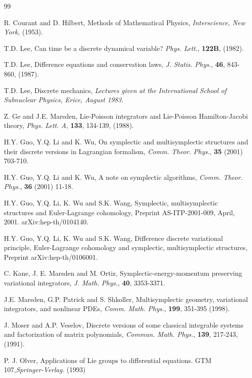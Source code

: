 \documentclass[a4paper,a4paper]{article}
\begin{document}
\begin{thebibliography} {99}

 \label{c1}
R. Courant and D. Hilbert, Methods of Mathematical Physics, {\em Interscience, New
York, } (1953).

\label{td1}
T.D. Lee, Can time be a discrete dynamical variable? {\em Phys.
Lett.}, {\bf 122B}, (1982).

\label{td2}
T.D. Lee, Difference equations and conservation laws, {\em J.
Statis. Phys.}, {\bf 46}, 843-860, (1987).

\label{td3}
T.D. Lee, Discrete mechanics, {\em Lectures given at the
International School of Subnuclear Physics, Erice, August 1983}.

\label{g1}
Z. Ge and J.E. Marsden, Lie-Poisson integrators and Lie-Poisson Hamilton-Jacobi
theory, {\em Phys. Lett. A}, {\bf 133}, 134-139, (1988).


\label{glw1} H.Y. Guo, Y.Q. Li and K. Wu, On symplectic and multisymplectic
structures and their discrete versions in Lagrangian formalism,
{\em Comm. Theor. Phys.}, {\bf 35} (2001) 703-710.

\label{glw2} H.Y. Guo,
Y.Q. Li and K. Wu, A note on symplectic algorithms, {\em Comm.
Theor. Phys.}, {\bf 36} (2001) 11-18.

\label{glw3} H.Y. Guo, Y.Q. Li, K. Wu and S.K. Wang,
Symplectic, multisymplectic structures and Euler-Lagrange
cohomology, Preprint AS-ITP-2001-009, April, 2001.
arXiv:hep-th/0104140.

\label{glww}
 H.Y. Guo, Y.Q. Li, K. Wu and S.K. Wang, Difference discrete variational principle,
 Euler-Lagrange cohomology and
 symplectic, multisymplectic structures, Preprint arXiv:hep-th/0106001.

\label{k1}
C. Kane, J. E. Marsden and M. Ortiz,  Symplectic-energy-momentum preserving
variational integrators, {\em J. Math. Phys.}, {\bf 40}, 3353-3371.


\label{m1}
J.E. Marsden, G.P. Patrick and S. Shkoller, Multisymplectic geometry,
variational integrators, and nonlinear PDEs, {\em Comm. Math. Phys.},
{\bf 199}, 351-395 (1998).


\label{m3}
J. Moser and A.P. Veselov, Discrete versions of some classical integrable systems
and factorization of matrix polynomials, {\em Commun. Math. Phys.}, {\bf 139},
217-243, (1991).

\label{o1}
 P. J. Olver, Applications of Lie groups to differential equations.
GTM 107,{\em Springer-Verlag.} (1993)


\end{thebibliography}
\end{document}
